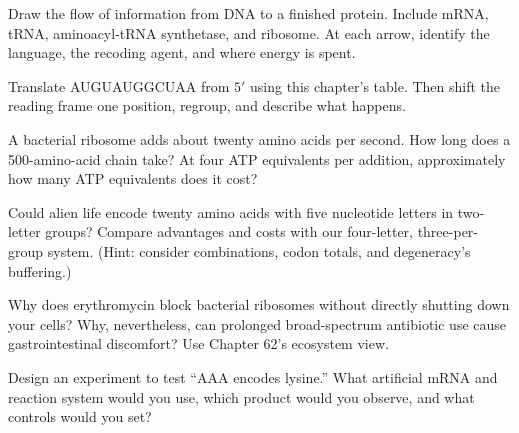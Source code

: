\begin{sikaoti}
\item Draw the flow of information from DNA to a finished protein. Include mRNA, tRNA, aminoacyl-tRNA synthetase, and ribosome. At each arrow, identify the language, the recoding agent, and where energy is spent.
\item Translate AUGUAUGGCUAA from $5'$ using this chapter's table. Then shift the reading frame one position, regroup, and describe what happens.
\item A bacterial ribosome adds about twenty amino acids per second. How long does a 500-amino-acid chain take? At four ATP equivalents per addition, approximately how many ATP equivalents does it cost?
\item Could alien life encode twenty amino acids with five nucleotide letters in two-letter groups? Compare advantages and costs with our four-letter, three-per-group system. (Hint: consider combinations, codon totals, and degeneracy's buffering.)
\item Why does erythromycin block bacterial ribosomes without directly shutting down your cells? Why, nevertheless, can prolonged broad-spectrum antibiotic use cause gastrointestinal discomfort? Use Chapter 62's ecosystem view.
\item Design an experiment to test ``AAA encodes lysine.'' What artificial mRNA and reaction system would you use, which product would you observe, and what controls would you set?
\end{sikaoti}
